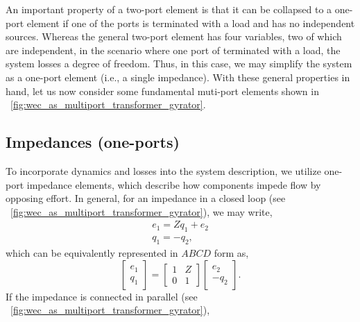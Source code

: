 \documentclass[lettersize,journal]{IEEEtran}
\begin{document}
An important property of a two-port element is that it can be collapsed to a one-port element if one of the ports is terminated with a load and has no independent sources.
Whereas the general two-port element has four variables, two of which are independent, in the scenario where one port of terminated with a load, the system losses a degree of freedom.
Thus, in this case, we may simplify the system as a one-port element (i.e., a single impedance).
With these general properties in hand, let us now consider some fundamental muti-port elements shown in \figurename~\ref{fig:wec_as_multiport_transformer_gyrator}.





\subsection{Impedances (one-ports)}\label{sec:impedances}
To incorporate dynamics and losses into the system description, we utilize one-port impedance elements, which describe how components impede flow by opposing effort. In general, for an impedance in a closed loop (see \figurename~\ref{fig:wec_as_multiport_transformer_gyrator}), we may write,
%
\begin{subequations}
        \begin{align}
                e_1 = Zq_1 + e_2 \\
                q_1 = -q_2 ,
        \end{align}
        \label{eq:impedance_eom}%
\end{subequations}
%
which can be equivalently represented in $ABCD$ form as,
%
\begin{equation}
        \begin{bmatrix}
                e_1 \\ q_1
        \end{bmatrix}
        =
        \begin{bmatrix}
                1 & Z \\ 0 & 1
        \end{bmatrix}
        \begin{bmatrix}
                e_2 \\ - q_2
        \end{bmatrix} .
        \label{eq:impedance_abcd}%
\end{equation}
%
If the impedance is connected in parallel (see \figurename~\ref{fig:wec_as_multiport_transformer_gyrator}),
\end{document}
